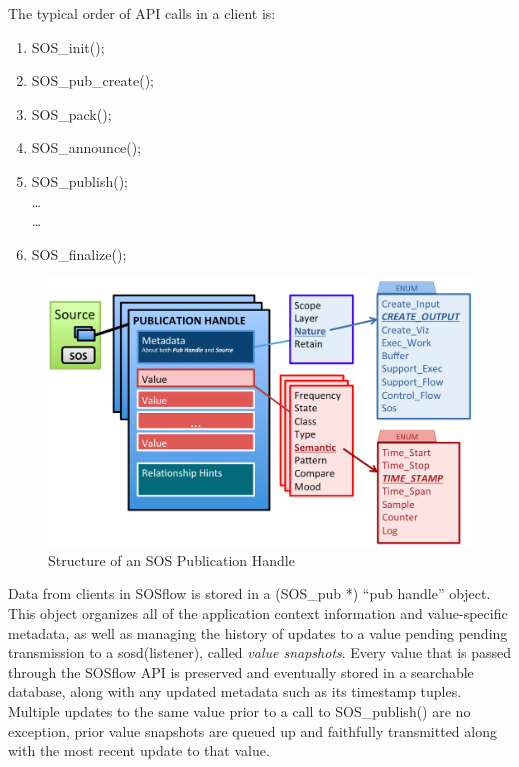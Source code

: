 The typical order of API calls in a client is:
%
\begin{enumerate}
    \item SOS\_init();
    \item SOS\_pub\_create();
    \item SOS\_pack();
    \item SOS\_announce();
    \item SOS\_publish();\\
    \dots\\
    \dots\\
    \item SOS\_finalize();
\end{enumerate}

\begin{figure}[!t]
\centering
\includegraphics[width=5in]{images/pub_handle.png}
\caption{Structure of an SOS Publication Handle}
\label{fig_sim}
\end{figure}

Data from clients in SOSflow is stored in a (SOS\_pub *) ``pub handle''
object.
%
This object organizes all of the application context information and
value-specific metadata, as well as managing the history of updates to
a value pending pending transmission to a sosd(listener), called
\textit{value snapshots}.
%
Every value that is passed through the SOSflow API is preserved and
eventually stored in a searchable database, along with any updated
metadata such as its timestamp tuples.
%
Multiple updates to the same value prior to a call to SOS\_publish()
are no exception, prior value snapshots are queued up and faithfully
transmitted along with the most recent update to that value.

